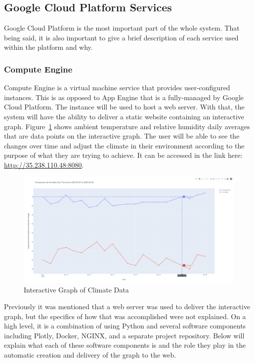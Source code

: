 \documentclass{article}
\begin{document}
\subsection{Google Cloud Platform Services}
\label{section:gcp}
Google Cloud Platform is the most important part of the whole system. That being said, it is also important to give a brief description of each service used within the platform and why.

\subsubsection{Compute Engine}
\label{section:compute-engine}
Compute Engine is a virtual machine service that provides user-configured instances. This is as opposed to App Engine that is a fully-managed by Google Cloud Platform. The instance will be used to host a web server. With that, the system will have the ability to deliver a static website containing an interactive graph. Figure~\ref{fig:interactive-graph} shows ambient temperature and relative humidity daily averages that are data points on the interactive graph. The user will be able to see the changes over time and adjust the climate in their environment according to the purpose of what they are trying to achieve. It can be accessed in the link here: \url{http://35.238.110.48:8080}.

\begin{figure}[H]
	\center
	\includegraphics[width=\textwidth]{images/interactive-graph.png}
	\caption{Interactive Graph of Climate Data}
	\label{fig:interactive-graph}
\end{figure}

Previously it was mentioned that a web server was used to deliver the interactive graph, but the specifics of how that was accomplished were not explained. On a high level, it is a combination of using Python and several software components including Plotly, Docker, NGINX, and a separate project repository. Below will explain what each of these software components is and the role they play in the automatic creation and delivery of the graph to the web.\\
\end{document}
